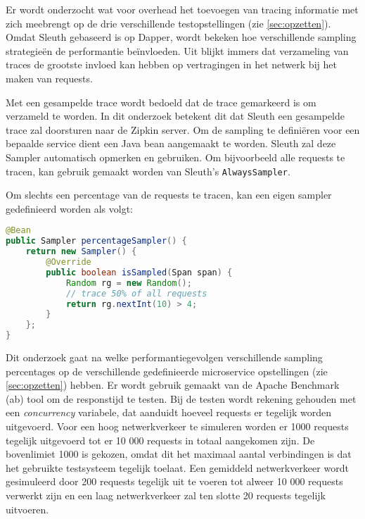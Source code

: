 Er wordt onderzocht wat voor overhead het toevoegen van tracing informatie met zich meebrengt op de drie verschillende testopstellingen (zie \ref{sec:opzetten}). Omdat Sleuth gebaseerd is op Dapper, wordt bekeken hoe verschillende sampling strategieën de performantie beïnvloeden. Uit \autocite{Sigelman2010} blijkt immers dat verzameling van traces de grootste invloed kan hebben op vertragingen in het netwerk bij het maken van requests.

Met een gesampelde trace wordt bedoeld dat de trace gemarkeerd is om verzameld te worden. In dit onderzoek betekent dit dat Sleuth een gesampelde trace zal doorsturen naar de Zipkin server. Om de sampling te definiëren voor een bepaalde service dient een Java bean aangemaakt te worden. Sleuth zal deze Sampler automatisch opmerken en gebruiken. Om bijvoorbeeld alle requests te tracen, kan gebruik gemaakt worden van Sleuth's \texttt{AlwaysSampler}.

Om slechts een percentage van de requests te tracen, kan een eigen sampler gedefinieerd worden als volgt:

\begin{lstlisting}[language=Java, basicstyle=\ttfamily\small, caption=Sleuth percentage sampler]
@Bean
public Sampler percentageSampler() {
    return new Sampler() {
        @Override
        public boolean isSampled(Span span) {
            Random rg = new Random();
            // trace 50% of all requests
            return rg.nextInt(10) > 4;
        }
    };
}
\end{lstlisting}

Dit onderzoek gaat na welke performantiegevolgen verschillende sampling percentages op de verschillende gedefinieerde microservice opstellingen (zie \ref{sec:opzetten}) hebben. Er wordt gebruik gemaakt van de Apache Benchmark (ab) tool om de responstijd te testen. Bij de testen wordt rekening gehouden met een \textit{concurrency} variabele, dat aanduidt hoeveel requests er tegelijk worden uitgevoerd. Voor een hoog netwerkverkeer te simuleren worden er 1000 requests tegelijk uitgevoerd tot er 10 000 requests in totaal aangekomen zijn. De bovenlimiet 1000 is gekozen, omdat dit het maximaal aantal verbindingen is dat het gebruikte testsysteem tegelijk toelaat. Een gemiddeld netwerkverkeer wordt gesimuleerd door 200 requests tegelijk uit te voeren tot alweer 10 000 requests verwerkt zijn en een laag netwerkverkeer zal ten slotte 20 requests tegelijk uitvoeren.

